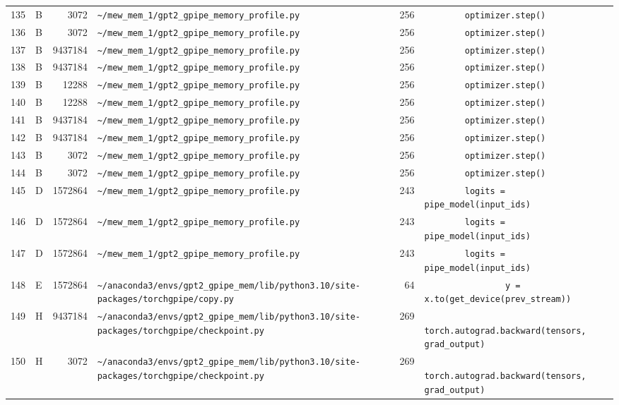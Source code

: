 \documentclass{article}
\begin{document}
\begin{longtable}{r l r p{6.5cm} r p{7.0cm}}
135 & B & 3072 & \lstinline|~/mew_mem_1/gpt2_gpipe_memory_profile.py| & 256 & \lstinline|        optimizer.step()| \\
136 & B & 3072 & \lstinline|~/mew_mem_1/gpt2_gpipe_memory_profile.py| & 256 & \lstinline|        optimizer.step()| \\
137 & B & 9437184 & \lstinline|~/mew_mem_1/gpt2_gpipe_memory_profile.py| & 256 & \lstinline|        optimizer.step()| \\
138 & B & 9437184 & \lstinline|~/mew_mem_1/gpt2_gpipe_memory_profile.py| & 256 & \lstinline|        optimizer.step()| \\
139 & B & 12288 & \lstinline|~/mew_mem_1/gpt2_gpipe_memory_profile.py| & 256 & \lstinline|        optimizer.step()| \\
140 & B & 12288 & \lstinline|~/mew_mem_1/gpt2_gpipe_memory_profile.py| & 256 & \lstinline|        optimizer.step()| \\
141 & B & 9437184 & \lstinline|~/mew_mem_1/gpt2_gpipe_memory_profile.py| & 256 & \lstinline|        optimizer.step()| \\
142 & B & 9437184 & \lstinline|~/mew_mem_1/gpt2_gpipe_memory_profile.py| & 256 & \lstinline|        optimizer.step()| \\
143 & B & 3072 & \lstinline|~/mew_mem_1/gpt2_gpipe_memory_profile.py| & 256 & \lstinline|        optimizer.step()| \\
144 & B & 3072 & \lstinline|~/mew_mem_1/gpt2_gpipe_memory_profile.py| & 256 & \lstinline|        optimizer.step()| \\
145 & D & 1572864 & \lstinline|~/mew_mem_1/gpt2_gpipe_memory_profile.py| & 243 & \lstinline|        logits = pipe_model(input_ids)| \\
146 & D & 1572864 & \lstinline|~/mew_mem_1/gpt2_gpipe_memory_profile.py| & 243 & \lstinline|        logits = pipe_model(input_ids)| \\
147 & D & 1572864 & \lstinline|~/mew_mem_1/gpt2_gpipe_memory_profile.py| & 243 & \lstinline|        logits = pipe_model(input_ids)| \\
148 & E & 1572864 & \lstinline|~/anaconda3/envs/gpt2_gpipe_mem/lib/python3.10/site-packages/torchgpipe/copy.py| & 64 & \lstinline|                y = x.to(get_device(prev_stream))| \\
149 & H & 9437184 & \lstinline|~/anaconda3/envs/gpt2_gpipe_mem/lib/python3.10/site-packages/torchgpipe/checkpoint.py| & 269 & \lstinline|            torch.autograd.backward(tensors, grad_output)| \\
150 & H & 3072 & \lstinline|~/anaconda3/envs/gpt2_gpipe_mem/lib/python3.10/site-packages/torchgpipe/checkpoint.py| & 269 & \lstinline|            torch.autograd.backward(tensors, grad_output)| \\

\end{longtable}
\end{document}
